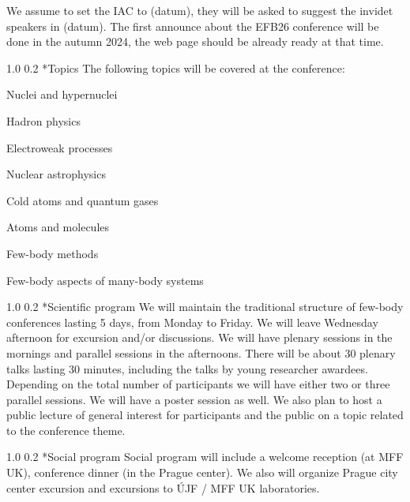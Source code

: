 \documentclass[12pt]{extarticle}
\makeatletter
\renewcommand{\section}{\@startsection{section}{1}{0mm}
{1.0\baselineskip}%
{0.2\baselineskip}%
{\normalfont\large\bfseries}}%
\newcommand*\sq{\mathbin{\vcenter{\hbox{\rule{.8ex}{.8ex}}}}}
\newenvironment{t_sq_itemize}
{\begin{itemize}[topsep=0pt, parsep=0pt, itemsep=0pt, leftmargin=*]
    \renewcommand{\labelitemi}{{\(\sq\)}}}
  {\end{itemize}}
\makeatother
\begin{document}
We assume to set the IAC to (datum), they will be asked to suggest the invidet speakers in (datum). 
The first announce about the EFB26 conference will be done in the autumn 2024, the web page
should be already ready at that time.

\section*{Topics}
\noindent
The following topics will be covered at the conference:
\begin{t_sq_itemize}
\item Nuclei and hypernuclei
\item Hadron physics
\item Electroweak processes
\item Nuclear astrophysics
\item Cold atoms and quantum gases
\item Atoms and molecules
\item Few-body methods
\item Few-body aspects of many-body systems
\end{t_sq_itemize}

\section*{Scientific program}
\noindent
We will maintain the traditional structure of few-body conferences lasting 5 days, from Monday
to Friday. We will leave Wednesday afternoon for excursion and/or discussions. We will have plenary sessions
in the mornings and parallel sessions in the afternoons. There will be about 30 plenary talks lasting
30 minutes, including the talks by young researcher awardees. Depending on the total number of
participants we will have either two or three parallel sessions. We will have a poster session as well.
We also plan to host a public lecture of general interest for participants and the public on a topic related
to the conference theme. 

\section*{Social program}
\noindent
Social program will include a welcome reception (at MFF UK), conference dinner (in the Prague center). 
We also will organize Prague city center excursion and excursions to ÚJF / MFF UK laboratories.
\end{document}
